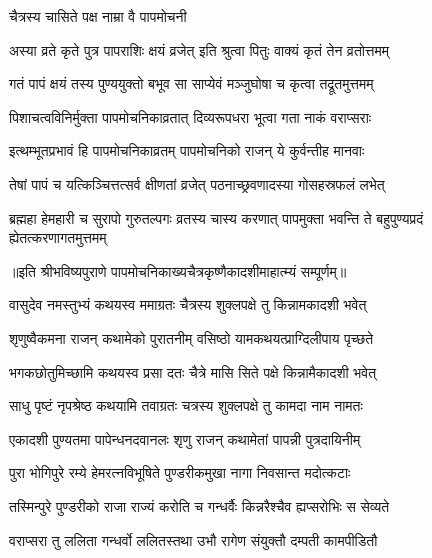 
\onelineshloka
{चैत्रस्य चासिते पक्ष नाम्रा वै पापमोचनी} %

\twolineshloka
{अस्या व्रते कृते पुत्र पापराशिः क्षयं व्रजेत्}
{इति श्रुत्वा पितुः वाक्यं कृतं तेन व्रतोत्तमम्} %

\twolineshloka
{गतं पापं क्षयं तस्य पुण्ययुक्तो बभूव सा}
{साप्येवं मञ्जुघोषा च कृत्वा तद्रूतमुत्तमम्} %

\twolineshloka
{पिशाचत्वविनिर्मुक्ता पापमोचनिकाव्रतात्}
{दिव्यरूपधरा भूत्वा गता नाकं वराप्सराः} %


\twolineshloka
{इत्थम्भूतप्रभावं हि पापमोचनिकाव्रतम्}
{पापमोचनिको राजन् ये कुर्वन्तीह मानवाः} %

\twolineshloka
{तेषां पापं च यत्किञ्चित्तत्सर्व क्षीणतां व्रजेत्}
{पठनाच्छ्रवणादस्या गोसहस्रफलं लभेत्} %


\threelineshloka
{ब्रह्महा हेमहारी च सुरापो गुरुतल्पगः}
{व्रतस्य चास्य करणात् पापमुक्ता भवन्ति ते}
{बहुपुण्यप्रदं ह्येतत्करणागतमुत्तमम्} %

॥इति श्रीभविष्यपुराणे पापमोचनिकाख्यचैत्रकृष्णैकादशीमाहात्म्यं सम्पूर्णम्॥



\twolineshloka
{वासुदेव नमस्तुभ्यं कथयस्व ममाग्रतः}
{चैत्रस्य शुक्लपक्षे तु किन्नामकादशी भवेत्} %


\twolineshloka
{शृणुष्वैकमना राजन् कथामेको पुरातनीम्}
{वसिष्ठो यामकथयत्प्राग्दिलीपाय पृच्छते} %


\twolineshloka
{भगकछोतुमिच्छामि कथयस्व प्रसा दतः}
{चैत्रे मासि सिते पक्षे किन्नामैकादशी भवेत्} %


\twolineshloka
{साधु पृष्टं नृपश्रेष्ठ कथयामि तवाग्रतः}
{चत्रस्य शुक्लपक्षे तु कामदा नाम नामतः} %

\twolineshloka
{एकादशी पुण्यतमा पापेन्धनदवानलः}
{शृणु राजन् कथामेतां पापन्नी पुत्रदायिनीम्} %

\twolineshloka
{पुरा भोगिपुरे रम्ये हेमरत्नविभूषिते}
{पुण्डरीकमुखा नागा निवसान्त मदोत्कटाः} %

\twolineshloka
{तस्मिन्पुरे पुण्डरीको राजा राज्यं करोति च}
{गन्धर्वैः किन्नरैश्चैव ह्यप्सरोभिः स सेव्यते} %

\twolineshloka
{वराप्सरा तु ललिता गन्धर्वो ललितस्तथा}
{उभौ रागेण संयुक्तौ दम्पती कामपीडितौ} %

